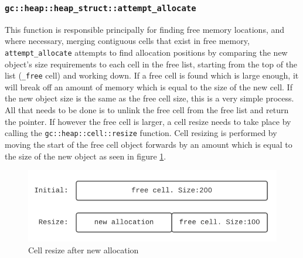 \documentclass[11pt]{article}
\begin{document}
\subsubsection{\texttt{gc::heap::heap\_struct::attempt\_allocate}}
This function is responsible principally for finding free memory locations, and where necessary, merging contiguous cells
that exist in free memory, \texttt{attempt\_allocate} attempts to find allocation positions by comparing the new object's size
requirements to each cell in the free list, starting from the top of the list (\texttt{\_free} cell) and working down.
If a free cell is found which is large enough, it will break off an amount of memory which is equal to the size of the new cell.
If the new object size is the same as the free cell size, this is a very simple process. All that needs to
be done is to unlink the free cell from the free list and return the pointer. If however the free cell is larger, a cell
resize needs to take place by calling the \texttt{gc::heap::cell::resize} function.
Cell resizing is performed by moving the start of the free cell object forwards by an amount which is equal to the
size of the new object as seen in figure \ref{fig:initialresize}.
\begin{figure}
\begin{center}
\includegraphics[scale=0.5]{./report_srcs/initial_to_resize.png}
\end{center}
\caption{Cell resize after new allocation}
\label{fig:initialresize}
\end{figure}
\end{document}
